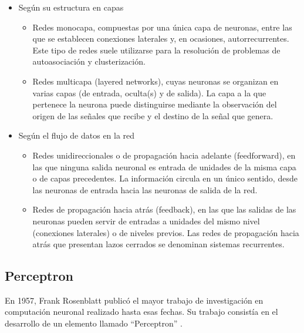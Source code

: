 \begin{itemize}
  \item Según su estructura en capas
        \begin{itemize}
          \item Redes monocapa, compuestas por una única capa de neuronas, entre las que se
                establecen conexiones laterales y, en ocasiones, autorrecurrentes. Este tipo de
                redes suele utilizarse para la resolución de problemas de autoasociación y
                clusterización.

          \item Redes multicapa (layered networks), cuyas neuronas se organizan en varias capas
                (de entrada, oculta(s) y de salida). La capa a la que pertenece la neurona
                puede distinguirse mediante la observación del origen de las señales que recibe
                y el destino de la señal que genera.
        \end{itemize}

  \item Según el flujo de datos en la red

        \begin{itemize}
          \item Redes unidireccionales o de propagación hacia adelante (feedforward), en las
                que ninguna salida neuronal es entrada de unidades de la misma capa o de capas
                precedentes. La información circula en un único sentido, desde las neuronas de
                entrada hacia las neuronas de salida de la red.

          \item Redes de propagación hacia atrás (feedback), en las que las salidas de las
                neuronas pueden servir de entradas a unidades del mismo nivel (conexiones
                laterales) o de niveles previos. Las redes de propagación hacia atrás que
                presentan lazos cerrados se denominan sistemas recurrentes.
        \end{itemize}
\end{itemize}
\subsection{Perceptron}
En 1957, Frank Rosenblatt publicó el mayor trabajo de investigación en
computación neuronal realizado hasta esas fechas. Su trabajo consistía en el
desarrollo de un elemento llamado “Perceptron” \cite{olabe1998redes}.

